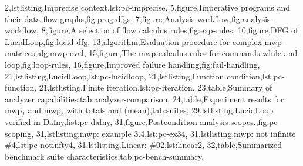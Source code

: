 {        2,lstlisting,{Imprecise context},lst:pc-imprecise,
        5,figure,{Imperative programs and their data flow graphs},fig:prog-dfgs,
        7,figure,{Analysis workflow},fig:analysis-workflow,
        8,figure,{A selection of flow calculus rules},fig:exp-rules,
        10,figure,{DFG of LucidLoop},fig:lucid-dfg,
        13,algorithm,{Evaluation procedure for complex mwp-matrices},alg:mwp-eval,
        15,figure,{The mwp-calculus rules for commands while and loop},fig:loop-rules,
        16,figure,{Improved failure handling},fig:fail-handling,
        21,lstlisting,{LucidLoop},lst:pc-lucidloop,
        21,lstlisting,{Function condition},lst:pc-function,
        21,lstlisting,{Finite iteration},lst:pc-iteration,
        23,table,{Summary of analyzer capabilities},tab:analyzer-comparison,
        24,table,{Experiment results for mwp$_f$ and mwp$_\ell$ with totals and (mean)},tab:suites,
        29,lstlisting,{LucidLoop verified in Dafny},list:pc-dafny,
        31,figure,{Postcondition analysis scopes.},fig:pc-scoping,
        31,lstlisting,{mwp: example 3.4},lst:pc-ex34,
        31,lstlisting,{mwp: not infinite \#4},lst:pc-notinfty4,
        31,lstlisting,{Linear: \#02},lst:linear2,
        32,table,{Summarized benchmark suite characteristics},tab:pc-bench-summary},
